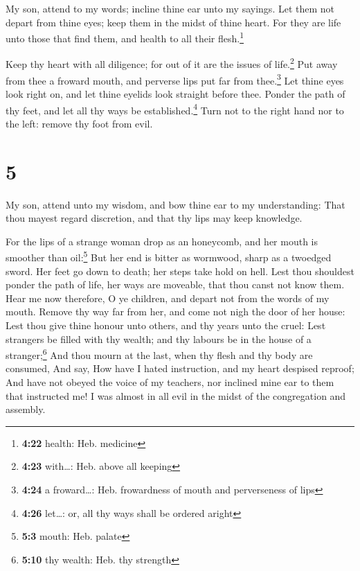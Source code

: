  My son, attend to my words; incline thine ear unto my
sayings.  Let them not depart from thine eyes; keep them
in the midst of thine heart.  For they are life unto
those that find them, and health to all their flesh.\footnote{\textbf{4:22}
  health: Heb. medicine}

 Keep thy heart with all diligence; for out of it are the
issues of life.\footnote{\textbf{4:23} with\ldots: Heb. above all
  keeping}  Put away from thee a froward mouth, and
perverse lips put far from thee.\footnote{\textbf{4:24} a froward\ldots:
  Heb. frowardness of mouth and perverseness of lips} 
Let thine eyes look right on, and let thine eyelids look straight before
thee.  Ponder the path of thy feet, and let all thy ways
be established.\footnote{\textbf{4:26} let\ldots: or, all thy ways shall
  be ordered aright}  Turn not to the right hand nor to
the left: remove thy foot from evil.

\hypertarget{section-4}{%
\section{5}\label{section-4}}

 My son, attend unto my wisdom, and bow thine ear to my
understanding:  That thou mayest regard discretion, and
that thy lips may keep knowledge.

 For the lips of a strange woman drop as an honeycomb, and
her mouth is smoother than oil:\footnote{\textbf{5:3} mouth: Heb. palate}
 But her end is bitter as wormwood, sharp as a twoedged
sword.  Her feet go down to death; her steps take hold on
hell.  Lest thou shouldest ponder the path of life, her
ways are moveable, that thou canst not know them.  Hear me
now therefore, O ye children, and depart not from the words of my mouth.
 Remove thy way far from her, and come not nigh the door
of her house:  Lest thou give thine honour unto others,
and thy years unto the cruel:  Lest strangers be filled
with thy wealth; and thy labours be in the house of a
stranger;\footnote{\textbf{5:10} thy wealth: Heb. thy strength}
 And thou mourn at the last, when thy flesh and thy body
are consumed,  And say, How have I hated instruction, and
my heart despised reproof;  And have not obeyed the voice
of my teachers, nor inclined mine ear to them that instructed me!
 I was almost in all evil in the midst of the
congregation and assembly.

